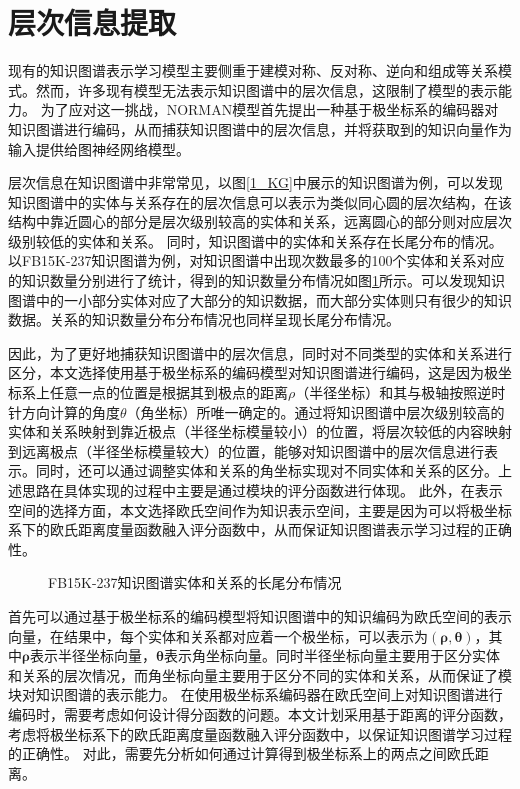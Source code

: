 \documentclass[algorithmlist, AutoFakeBold, AutoFakeSlant, figurelist, tablelist, nomlist, engineering]{seuthesix}
\begin{document}
\section{层次信息提取}
现有的知识图谱表示学习模型主要侧重于建模对称、反对称、逆向和组成等关系模式。然而，许多现有模型无法表示知识图谱中的层次信息，这限制了模型的表示能力。
为了应对这一挑战，NORMAN模型首先提出一种基于极坐标系的编码器对知识图谱进行编码，从而捕获知识图谱中的层次信息，并将获取到的知识向量作为输入提供给图神经网络模型。

层次信息在知识图谱中非常常见，以图\ref{1_KG}中展示的知识图谱为例，可以发现知识图谱中的实体与关系存在的层次信息可以表示为类似同心圆的层次结构，在该结构中靠近圆心的部分是层次级别较高的实体和关系，远离圆心的部分则对应层次级别较低的实体和关系。
同时，知识图谱中的实体和关系存在长尾分布的情况。以FB15K-237知识图谱为例，对知识图谱中出现次数最多的100个实体和关系对应的知识数量分别进行了统计，得到的知识数量分布情况如图\ref{2_LongTail}所示。可以发现知识图谱中的一小部分实体对应了大部分的知识数据，而大部分实体则只有很少的知识数据。关系的知识数量分布分布情况也同样呈现长尾分布情况。

因此，为了更好地捕获知识图谱中的层次信息，同时对不同类型的实体和关系进行区分，本文选择使用基于极坐标系的编码模型对知识图谱进行编码，这是因为极坐标系上任意一点的位置是根据其到极点的距离$\rho$（半径坐标）和其与极轴按照逆时针方向计算的角度$\theta$（角坐标）所唯一确定的。通过将知识图谱中层次级别较高的实体和关系映射到靠近极点（半径坐标模量较小）的位置，将层次较低的内容映射到远离极点（半径坐标模量较大）的位置，能够对知识图谱中的层次信息进行表示。同时，还可以通过调整实体和关系的角坐标实现对不同实体和关系的区分。上述思路在具体实现的过程中主要是通过模块的评分函数进行体现。
此外，在表示空间的选择方面，本文选择欧氏空间作为知识表示空间，主要是因为可以将极坐标系下的欧氏距离度量函数融入评分函数中，从而保证知识图谱表示学习过程的正确性。
\begin{figure}
  \centering
  \caption{FB15K-237知识图谱实体和关系的长尾分布情况}
  \label{2_LongTail}
\end{figure}

首先可以通过基于极坐标系的编码模型将知识图谱中的知识编码为欧氏空间的表示向量，在结果中，每个实体和关系都对应着一个极坐标，可以表示为$(\bm{\rho}, \bm{\theta})$，其中$\bm{\rho}$表示半径坐标向量，$\bm{\theta}$表示角坐标向量。同时半径坐标向量主要用于区分实体和关系的层次情况，而角坐标向量主要用于区分不同的实体和关系，从而保证了模块对知识图谱的表示能力。
在使用极坐标系编码器在欧氏空间上对知识图谱进行编码时，需要考虑如何设计得分函数的问题。本文计划采用基于距离的评分函数，考虑将极坐标系下的欧氏距离度量函数融入评分函数中，以保证知识图谱学习过程的正确性。
对此，需要先分析如何通过计算得到极坐标系上的两点之间欧氏距离。
\end{document}
